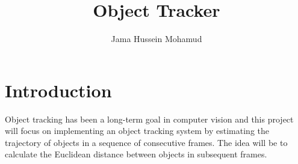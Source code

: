 \documentclass[11pt,a4paper]{article}
\author{Jama Hussein Mohamud}
\title{Object Tracker}
\begin{document}
\maketitle
{}
\section{Introduction}
Object tracking has been a long-term goal in computer vision and this project will focus on implementing an object tracking system by estimating the trajectory of objects in a sequence of consecutive frames. The idea will be to calculate the Euclidean distance between objects in subsequent frames. \\
\end{document}

